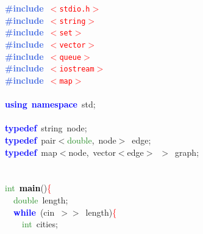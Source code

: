 
{\ttfamily \raggedright {
\noindent
\mbox{}\textbf{\textcolor{RoyalBlue}{\#include}}\ \texttt{\textcolor{Red}{$<$stdio.h$>$}} \\
\mbox{}\textbf{\textcolor{RoyalBlue}{\#include}}\ \texttt{\textcolor{Red}{$<$string$>$}} \\
\mbox{}\textbf{\textcolor{RoyalBlue}{\#include}}\ \texttt{\textcolor{Red}{$<$set$>$}} \\
\mbox{}\textbf{\textcolor{RoyalBlue}{\#include}}\ \texttt{\textcolor{Red}{$<$vector$>$}} \\
\mbox{}\textbf{\textcolor{RoyalBlue}{\#include}}\ \texttt{\textcolor{Red}{$<$queue$>$}} \\
\mbox{}\textbf{\textcolor{RoyalBlue}{\#include}}\ \texttt{\textcolor{Red}{$<$iostream$>$}} \\
\mbox{}\textbf{\textcolor{RoyalBlue}{\#include}}\ \texttt{\textcolor{Red}{$<$map$>$}} \\
\mbox{} \\
\mbox{}\textbf{\textcolor{Blue}{using}}\ \textbf{\textcolor{Blue}{namespace}}\ std\textcolor{BrickRed}{;} \\
\mbox{} \\
\mbox{}\textbf{\textcolor{Blue}{typedef}}\ string\ node\textcolor{BrickRed}{;} \\
\mbox{}\textbf{\textcolor{Blue}{typedef}}\ pair\textcolor{BrickRed}{$<$}\textcolor{ForestGreen}{double}\textcolor{BrickRed}{,}\ node\textcolor{BrickRed}{$>$}\ edge\textcolor{BrickRed}{;} \\
\mbox{}\textbf{\textcolor{Blue}{typedef}}\ map\textcolor{BrickRed}{$<$}node\textcolor{BrickRed}{,}\ vector\textcolor{BrickRed}{$<$}edge\textcolor{BrickRed}{$>$}\ \textcolor{BrickRed}{$>$}\ graph\textcolor{BrickRed}{;} \\
\mbox{} \\
\mbox{} \\
\mbox{}\textcolor{ForestGreen}{int}\ \textbf{\textcolor{Black}{main}}\textcolor{BrickRed}{()}\textcolor{Red}{\{} \\
\mbox{}\ \ \textcolor{ForestGreen}{double}\ length\textcolor{BrickRed}{;} \\
\mbox{}\ \ \textbf{\textcolor{Blue}{while}}\ \textcolor{BrickRed}{(}cin\ \textcolor{BrickRed}{$>$$>$}\ length\textcolor{BrickRed}{)}\textcolor{Red}{\{} \\
\mbox{}\ \ \ \ \textcolor{ForestGreen}{int}\ cities\textcolor{BrickRed}{;} \\
}}
